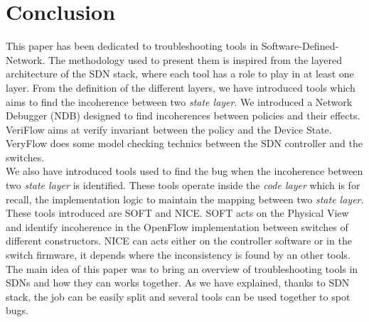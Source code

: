 \documentclass[10pt,article]{IEEEtran}
\begin{document}
\section{Conclusion}

This paper has been dedicated to troubleshooting tools in Software-Defined-Network. The methodology used to present them is inspired from the layered architecture of the SDN stack, where each tool has a role to play in at least one layer. From the definition of the different layers, we have introduced tools which aims to find the incoherence between two \textit{state layer}. We introduced a Network Debugger (NDB) designed to find incoherences between policies and their effects. VeriFlow aims at verify invariant between the policy and the Device State. VeryFlow does some model checking technics between the SDN controller and the switches.\\
We also have introduced tools used to find the bug when the incoherence between two \textit{state layer} is identified. These tools operate inside the \textit{code layer} which is for recall, the implementation logic to maintain the mapping between two \textit{state layer}. These tools introduced are SOFT and NICE. SOFT acts on the Physical View and identify incoherence in the OpenFlow implementation between switches of different constructors. NICE can acts either on the controller software or in the switch firmware, it depends where the inconsistency is found by an other tools. \\
The main idea of this paper was to bring an overview of troubleshooting tools in SDNs and how they can works together. As we have explained, thanks to SDN stack, the job can be easily split and several tools can be used together to spot bugs. 



\end{document}
